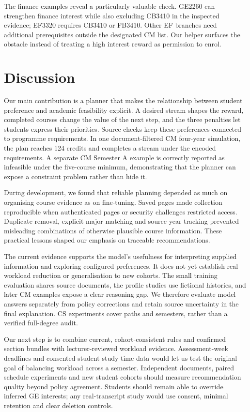 \documentclass{article}
\begin{document}
The finance examples reveal a particularly valuable check. GE2260 can strengthen finance interest while also excluding CB3410 in the inspected evidence; EF3320 requires CB3410 or FB3410. Other EF branches need additional prerequisites outside the designated CM list\citep{cityu-finance}. Our helper surfaces the obstacle instead of treating a high interest reward as permission to enrol.

\newpage
\section{Discussion}
Our main contribution is a planner that makes the relationship between student preference and academic feasibility explicit. A desired stream shapes the reward, completed courses change the value of the next step, and the three penalties let students express their priorities. Source checks keep these preferences connected to programme requirements. In one document-filtered CM four-year simulation, the plan reaches 124 credits and completes a stream under the encoded requirements. A separate CM Semester A example is correctly reported as infeasible under the five-course minimum, demonstrating that the planner can expose a constraint problem rather than hide it.

During development, we found that reliable planning depended as much on organising course evidence as on fine-tuning. Saved pages made collection reproducible when authenticated pages or security challenges restricted access. Duplicate removal, explicit major matching and source-year tracking prevented misleading combinations of otherwise plausible course information. These practical lessons shaped our emphasis on traceable recommendations.

The current evidence supports the model's usefulness for interpreting supplied information and exploring configured preferences. It does not yet establish real workload reduction or generalisation to new cohorts. The small training evaluation shares source documents, the profile studies use fictional histories, and later CM examples expose a clear reasoning gap. We therefore evaluate model answers separately from policy corrections and retain source uncertainty in the final explanation. CS experiments cover paths and semesters, rather than a verified full-degree audit.

Our next step is to combine current, cohort-consistent rules and confirmed section bundles with lecturer-reviewed workload evidence. Assessment-week deadlines and consented student study-time data would let us test the original goal of balancing workload across a semester. Independent documents, paired schedule experiments and new student cohorts should measure recommendation quality beyond policy agreement. Students should remain able to override inferred GE interests; any real-transcript study would use consent, minimal retention and clear deletion controls.
\end{document}
